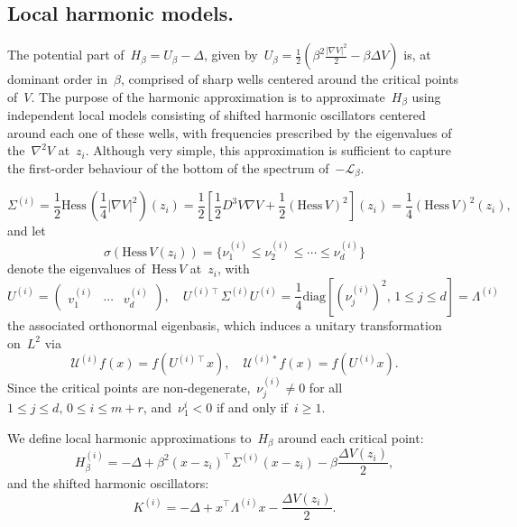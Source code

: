 \documentclass[10pt]{article}
\newcommand{\cL}{\mathcal{L}}
\newcommand{\Hess}{\mathrm{Hess}\,}
\newcommand{\1}{\mathbbm 1}
\newcommand{\Ki}[1]{K^{(i)}_{#1}}
\begin{document}
    \subsection{Local harmonic models.\newline}\label{subsec:local_oscillators}
    The potential part of~$H_\beta = U_\beta - \Delta$, given by~$U_\beta=\frac12\left(\beta^2\frac{|\nabla V|^2}2-\beta\Delta V\right)$ is, at dominant order in~$\beta$, comprised of sharp wells centered around the critical points of~$V$. 
    The purpose of the harmonic approximation is to approximate~$H_\beta$ using independent local models consisting of shifted harmonic oscillators centered around each one of these wells, with frequencies prescribed by the eigenvalues of the~$\nabla^2 V$ at~$z_i$.
    Although very simple, this approximation is sufficient to capture the first-order behaviour of the bottom of the spectrum of~$-\cL_\beta$. 

    \[\Sigma^{(i)} = \frac12\Hess (\frac14|\nabla V|^2)(z_i)  = \frac12\left[\frac12 D^3 V \nabla V + \frac12 \left( \Hess V\right)^2 \right](z_i) = \frac14 \left(\Hess V\right)^2(z_i),\]
    and let
    \[\sigma(\Hess V(z_i)) = \{\nu_1^{(i)} \leq \nu_2^{(i)} \leq \dotsm \leq \nu_d^{(i)}\}\]
    denote the eigenvalues of~$\Hess V$ at~$z_i$, with
    \[U^{(i)} =\begin{pmatrix}v_1^{(i)}&\dotsm&v_d^{(i)}\end{pmatrix},\quad U^{(i)\intercal} \Sigma^{(i)} U^{(i)} = \frac14\mathrm{diag}\left[\left(\nu_j^{(i)}\right)^2,\,1\leq j\leq d\right] = \Lambda^{(i)}\]
    the associated orthonormal eigenbasis, which induces a unitary transformation on~$L^2$ via
   ~$$ \mathcal U^{(i)} f(x) = f\left( U^{(i)\intercal}x\right),\quad \mathcal U^{(i)*} f(x) = f\left( U^{(i)}x\right).$$
    Since the critical points are non-degenerate,~$\nu_j^{(i)} \neq 0$ for all~$1\leq j\leq d,\,0\leq i \leq m+r$, and~$\nu_1^{i} < 0$ if and only if~$i\geq 1$.
    
    We define local harmonic approximations to~$H_\beta$ around each critical point:
    \[ H_\beta^{(i)} = -\Delta + \beta^2 (x-z_i)^\intercal \Sigma^{(i)}(x-z_i) - \beta \frac{\Delta V(z_i)}2, \]
    and the shifted harmonic oscillators:
    \[\Ki{} = -\Delta  + x^\intercal \Lambda^{(i)}x -\frac{\Delta V(z_i)}2.\]
\end{document}

